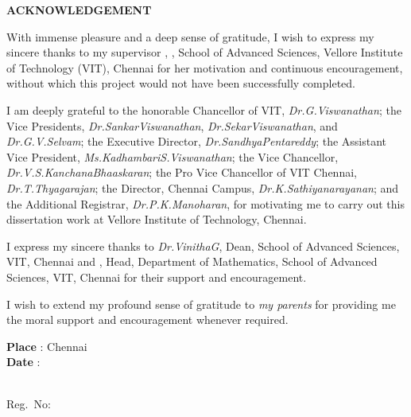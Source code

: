 
\thispagestyle{plain}
\begin{center}
	{\Large \bf \MakeUppercase{Acknowledgement}}
\end{center}

\sloppy
With immense pleasure and a deep sense of gratitude, I wish to express my sincere thanks to my supervisor \emph{\theguide}, \theguidedesignation, School of Advanced Sciences, Vellore Institute of Technology (VIT), Chennai for her motivation and continuous encouragement, without which this project would not have been successfully completed.

I am deeply grateful to the honorable Chancellor of VIT, {\em Dr.\;G.\;Viswanathan}; the Vice Presidents, 
{\em Dr.\;Sankar\;Viswanathan}, {\em Dr.\;Sekar\;Viswanathan}, and {\em Dr.\;G.\;V.\;Selvam}; the Executive 
Director, {\em Dr.\;Sandhya\;Pentareddy}; the Assistant Vice President, {\em Ms.\;Kadhambari\;S.\;Viswanathan}; 
the Vice Chancellor, {\em Dr.\;V.\;S.\;Kanchana\;Bhaaskaran}; the Pro Vice Chancellor of VIT Chennai, 
{\em Dr.\;T.\;Thyagarajan}; the Director, Chennai Campus, {\em Dr.\;K.\;Sathiyanarayanan}; and the Additional Registrar, {\em Dr.\;P.\;K.\;Manoharan}, for motivating me to carry 
out this dissertation work at Vellore Institute of Technology, Chennai.

I express my sincere thanks to {\em Dr.\;Vinitha\;G}, Dean, School of Advanced Sciences, VIT, Chennai and {\em \thehod}, Head, Department of Mathematics, School of Advanced Sciences, VIT, Chennai for their support and encouragement.

I wish to extend my profound sense of gratitude to {\em my parents} for providing me the moral support and encouragement whenever required.
\fussy



\vspace{3\baselineskip}

\begingroup
\linespread{1} \selectfont

\begin{minipage}[t]{.5\textwidth}
	\raggedright
	\textbf{Place} : Chennai \\[4pt]
	\textbf{Date}  :
\end{minipage}%
\begin{minipage}[t]{.5\textwidth}
	\raggedleft
	\textbf{\thestudent}\\
	Reg.\ No:\ \theregno
\end{minipage}

 \endgroup
